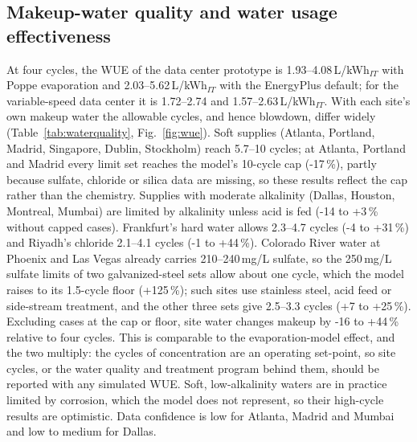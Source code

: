 \documentclass[preprint,12pt]{elsarticle}
\begin{document}
\subsection{Makeup-water quality and water usage effectiveness}\label{sec:wue}
At four cycles, the WUE of the data center prototype is 1.93--4.08\,L/kWh$_{IT}$ with Poppe evaporation and
2.03--5.62\,L/kWh$_{IT}$ with the EnergyPlus default; for the variable-speed data center it is 1.72--2.74 and
1.57--2.63\,L/kWh$_{IT}$. With each site's own makeup water the allowable cycles, and hence blowdown, differ widely
(Table~\ref{tab:waterquality}, Fig.~\ref{fig:wue}). Soft supplies (Atlanta, Portland, Madrid, Singapore, Dublin, Stockholm)
reach 5.7--10 cycles; at Atlanta, Portland and Madrid every limit set reaches the model's 10-cycle cap (-17\,\%), partly
because sulfate, chloride or silica data are missing, so these results reflect the cap rather than the chemistry.
Supplies with moderate alkalinity (Dallas, Houston, Montreal, Mumbai) are limited by alkalinity unless acid is fed
(-14 to +3\,\% without capped cases). Frankfurt's hard water allows 2.3--4.7 cycles (-4 to +31\,\%) and Riyadh's
chloride 2.1--4.1 cycles (-1 to +44\,\%). Colorado River water at Phoenix and Las Vegas already carries 210--240\,mg/L
sulfate, so the 250\,mg/L sulfate limits of two galvanized-steel sets allow about one cycle, which the model raises to its
1.5-cycle floor (+125\,\%); such sites use stainless steel, acid feed or side-stream treatment, and the other three sets give
2.5--3.3 cycles (+7 to +25\,\%). Excluding cases at the cap or floor, site water changes makeup by -16 to +44\,\% relative
to four cycles. This is comparable to the evaporation-model effect, and the two multiply: the cycles of concentration are
an operating set-point, so site cycles, or the water quality and treatment program behind them, should be reported with
any simulated WUE. Soft, low-alkalinity waters are in practice limited by corrosion, which the model does not represent,
so their high-cycle results are optimistic. Data confidence is low for Atlanta, Madrid and Mumbai and low to medium for
Dallas.
\end{document}
